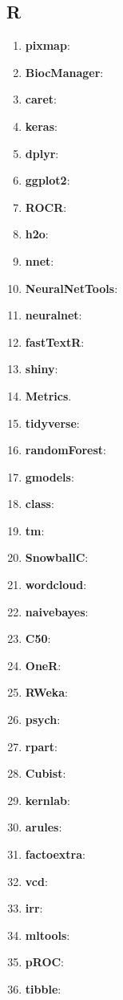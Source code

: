 \subsection{R}
\begin{enumerate}
    \item \textbf{pixmap}:
    \item \textbf{BiocManager}:
    \item \textbf{caret}:
    \item \textbf{keras}:
    \item \textbf{dplyr}:
    \item \textbf{ggplot2}:
    \item \textbf{ROCR}:
    \item \textbf{h2o}:
    \item \textbf{nnet}:
    \item \textbf{NeuralNetTools}:
    \item \textbf{neuralnet}:
    \item \textbf{fastTextR}:
    \item \textbf{shiny}:
    \item \textbf{Metrics}.
    \item \textbf{tidyverse}:
    \item \textbf{randomForest}:
    \item \textbf{gmodels}:
    \item \textbf{class}:
    \item \textbf{tm}:
    \item \textbf{SnowballC}:
    \item \textbf{wordcloud}:
    \item \textbf{naivebayes}:
    \item \textbf{C50}:
    \item \textbf{OneR}:
    \item \textbf{RWeka}:
    \item \textbf{psych}:
    \item \textbf{rpart}:
    \item \textbf{Cubist}:
    \item \textbf{kernlab}:
    \item \textbf{arules}:
    \item \textbf{factoextra}:
    \item \textbf{vcd}:
    \item \textbf{irr}:
    \item \textbf{mltools}:
    \item \textbf{pROC}:
    \item \textbf{tibble}:

\end{enumerate}
